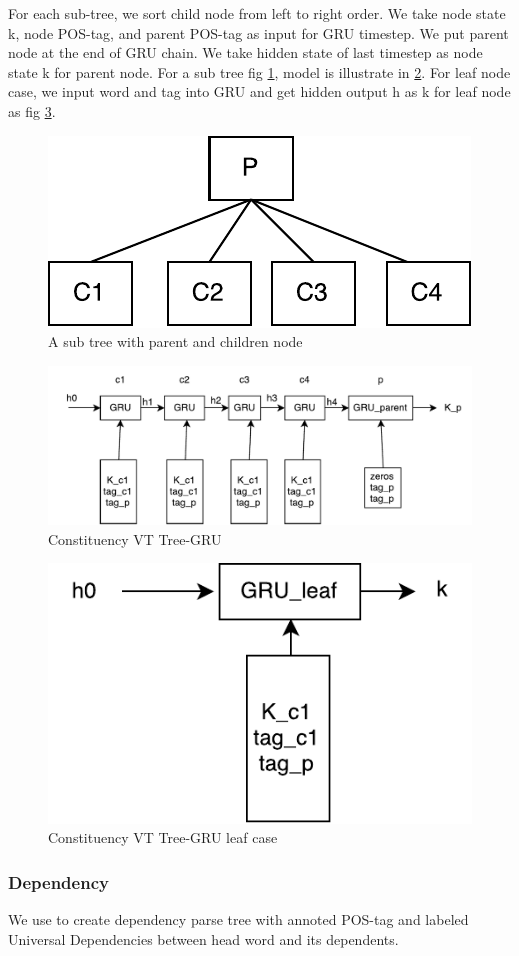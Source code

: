 For each sub-tree, we sort child node from left to right order. We take node state k, node POS-tag, and parent POS-tag as input for GRU timestep. We put parent node at the end of GRU chain. We take hidden state of last timestep as node state k for parent node. For a sub tree fig \ref{fig:treecp}, model is illustrate in \ref{fig:cvtgru}. For leaf node case, we input word and tag into GRU and get hidden output h as k for leaf node as fig \ref{fig:gruleaf}.
\begin{figure}[H]
	\centering
	\includegraphics[width=0.5\linewidth]{figure/treecp}
	\caption[A sub tree with parent and children node]{A sub tree with parent and children node}
	\label{fig:treecp}
\end{figure}

\begin{figure}[H]
	\centering
	\includegraphics[width=0.7\linewidth]{figure/cvtgru}
	\caption[Constituency VT Tree-GRU]{Constituency VT Tree-GRU}
	\label{fig:cvtgru}
\end{figure}

\begin{figure}[H]
	\centering
	\includegraphics[width=0.4\linewidth]{figure/gruleaf}
	\caption[Constituency VT Tree-GRU leaf case]{Constituency VT Tree-GRU leaf case}
	\label{fig:gruleaf}
\end{figure}



\subsubsection{Dependency} \label{sec:VTtreeDependency}
We use \cite{manning2014stanford} to create dependency parse tree with annoted POS-tag and labeled Universal Dependencies between head word and its dependents.

